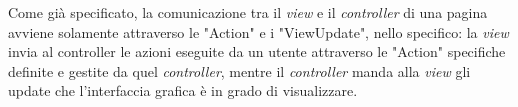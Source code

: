     Come già specificato, la comunicazione tra il  \textit{view} e il \textit{controller} di una pagina avviene solamente attraverso le "Action" e i "ViewUpdate", nello specifico: la  \textit{view} invia al controller le azioni eseguite da un utente attraverso le "Action" specifiche definite e gestite da quel \textit{controller}, mentre il \textit{controller} manda alla \textit{view} gli update che l'interfaccia grafica è in grado di visualizzare.
    